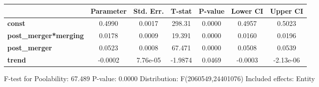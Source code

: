 \documentclass{report}
\begin{document}
\begin{center}
\begin{tabular}{lcccccc}
                              & \textbf{Parameter} & \textbf{Std. Err.} & \textbf{T-stat} & \textbf{P-value} & \textbf{Lower CI} & \textbf{Upper CI}  \\
\midrule
\textbf{const}                &       0.4990       &       0.0017       &      298.31     &      0.0000      &       0.4957      &       0.5023       \\
\textbf{post\_merger*merging} &       0.0178       &       0.0009       &      19.391     &      0.0000      &       0.0160      &       0.0196       \\
\textbf{post\_merger}         &       0.0523       &       0.0008       &      67.471     &      0.0000      &       0.0508      &       0.0539       \\
\textbf{trend}                &      -0.0002       &      7.76e-05      &     -1.9874     &      0.0469      &      -0.0003      &     -2.13e-06      \\
\bottomrule
\end{tabular}
\end{center}

F-test for Poolability: 67.489 \newline
 P-value: 0.0000 \newline
 Distribution: F(2060549,24401076) \newline
  \newline
 Included effects: Entity
\end{document}
